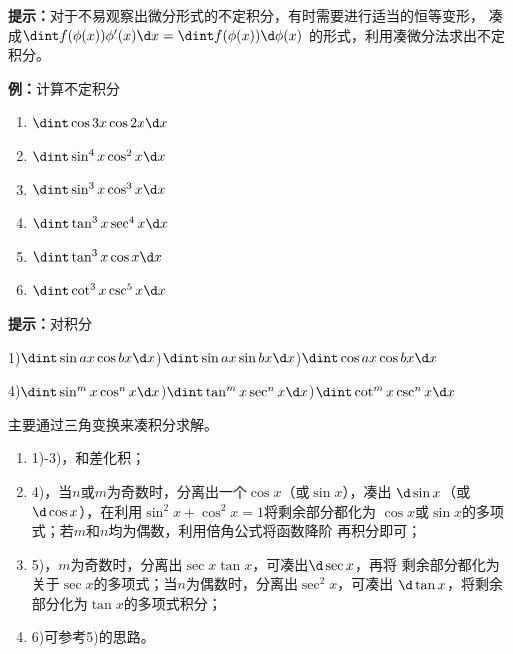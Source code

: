 % 
% 
% 
% 
% 
% 
% 

\begin{shaded}

{\bf 提示：}对于不易观察出微分形式的不定积分，有时需要进行适当的恒等变形，
凑成$\dint f(\phi(x))\phi'(x)\d x=\dint f(\phi(x))\d\phi(x)$
的形式，利用凑微分法求出不定积分。

\end{shaded}

{\bf 例：}计算不定积分
\begin{enumerate}[(1)]
  \setlength{\itemindent}{1cm}
  \item $\dint\cos3x\cos2x\d x$
  \item $\dint\sin^4x\cos^2x\d x$
  \item $\dint\sin^3x\cos^3x\d x$
  \item $\dint\tan^3x\sec^4x\d x$
  \item $\dint\tan^3x\cos x\d x$
  \item $\dint\cot^3x\csc^5x\d x$
\end{enumerate}


\begin{shaded}
{\bf 提示：}对积分

1)\;$\dint\sin ax\cos bx\d x$)$\dint\sin ax\sin bx\d x$)$\dint\cos ax\cos bx\d x$

4)$\dint\sin^mx\cos^nx \d x$)$\dint\tan^mx\sec^nx\d x$)$\dint\cot^mx\csc^nx\d x$

主要通过三角变换来凑积分求解。
\begin{enumerate}[(1)]
  \item 1)-3)，和差化积；
  \item 4)，当$n$或$m$为奇数时，分离出一个$\cos x$（或$\sin x$），凑出
  $\d\sin x$（或$\d\cos x$），在利用$\sin^2x+\cos^2x=1$将剩余部分都化为
  $\cos x$或$\sin x$的多项式；若$m$和$n$均为偶数，利用倍角公式将函数降阶
  再积分即可；
  \item 5)，$m$为奇数时，分离出$\sec x\tan x$，可凑出$\d\sec x$，再将
  剩余部分都化为关于$\sec x$的多项式；当$n$为偶数时，分离出$\sec^2x$，可凑出
  $\d\tan x$，将剩余部分化为$\tan x$的多项式积分；
  \item 6)可参考5)的思路。
\end{enumerate}
\end{shaded}

